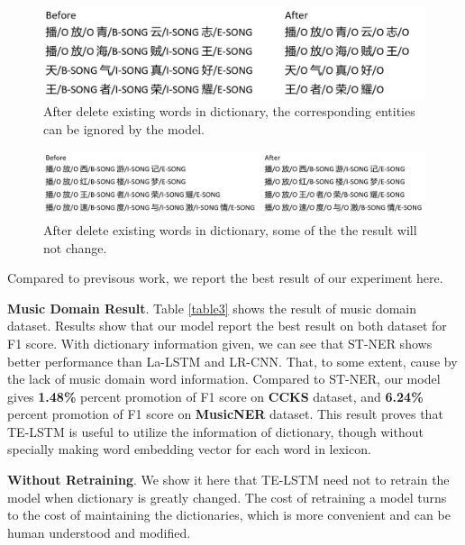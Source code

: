 \documentclass[letterpaper]{article} %
\begin{document}
\begin{figure}[t]
\centering
\includegraphics[width=0.8\columnwidth]{change_after_delete_song} %
\caption{After delete existing words in dictionary, the corresponding entities can be ignored by the model.}
\label{fig4}
\end{figure}

\begin{figure}[t]
\centering
\includegraphics[width=1.0\columnwidth]{no_change_after_delete_song} %
\caption{After delete existing words in dictionary, some of the the result will not change.}
\label{fig5}
\end{figure}

Compared to previsous work, we report the best result of our experiment here.

\textbf{Music Domain Result}. Table \ref{table3} shows the result of music domain dataset. Results show that our model report the best result on both dataset for F1 score. With dictionary information given, we can see that ST-NER shows better performance than La-LSTM and LR-CNN. That, to some extent, cause by the lack of music domain word information. Compared to ST-NER, our model gives \textbf{1.48\%} percent promotion of F1 score on \textbf{CCKS} dataset, and \textbf{6.24\%} percent promotion of F1 score on \textbf{MusicNER} dataset. This result proves that TE-LSTM is useful to utilize the information of dictionary, though without specially making word embedding vector for each word in lexicon.

\textbf{Without Retraining}. We show it here that TE-LSTM need not to retrain the model when dictionary is greatly changed. The cost of retraining a model turns to the cost of maintaining the dictionaries, which is more convenient and can be human understood and modified. 
\end{document}

